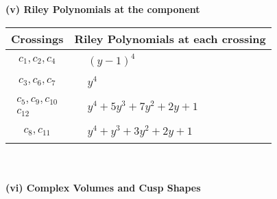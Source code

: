 \documentclass[1p]{elsarticle_modified}
\theoremstyle{definition}
\begin{document}
\newpage\renewcommand{\arraystretch}{1}
\flushleft \textbf{(v) Riley Polynomials at the component}\newline \\
\begin{tabular}{m{50pt}|m{274pt}}
Crossings & \hspace{64pt}Riley Polynomials at each crossing \\
\hline $$\begin{aligned}c_{1},c_{2},c_{4}\end{aligned}$$&$\begin{aligned}
&(y-1)^4
\end{aligned}$\\
\hline $$\begin{aligned}c_{3},c_{6},c_{7}\end{aligned}$$&$\begin{aligned}
&y^4
\end{aligned}$\\
\hline $$\begin{aligned}c_{5},c_{9},c_{10}\\c_{12}\end{aligned}$$&$\begin{aligned}
&y^4+5 y^3+7 y^2+2 y+1
\end{aligned}$\\
\hline $$\begin{aligned}c_{8},c_{11}\end{aligned}$$&$\begin{aligned}
&y^4+y^3+3 y^2+2 y+1
\end{aligned}$\\
\hline
\end{tabular}\\~\\
\newpage\flushleft \textbf{(vi) Complex Volumes and Cusp Shapes}
\end{document}
